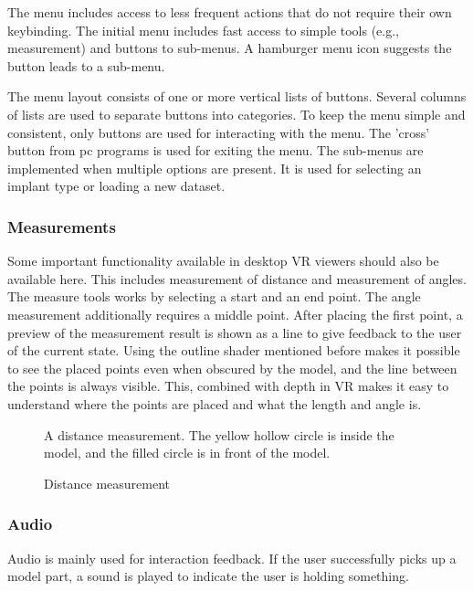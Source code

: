 \documentclass[a4paper]{report}
\begin{document}
The menu includes access to less frequent actions that do not require their own keybinding. The initial menu includes fast access to simple tools (e.g., measurement) and buttons to sub-menus. A hamburger menu icon suggests the button leads to a sub-menu.

The menu layout consists of one or more vertical lists of buttons. Several columns of lists are used to separate buttons into categories. To keep the menu simple and consistent, only buttons are used for interacting with the menu. The 'cross' button from pc programs is used for exiting the menu.
The sub-menus are implemented when multiple options are present. It is used for selecting an implant type or loading a new dataset.

\subsubsection{Measurements}
Some important functionality available in desktop VR viewers should also be available here. This includes measurement of distance and measurement of angles.
The measure tools works by selecting a start and an end point. The angle measurement additionally requires a middle point.
After placing the first point, a preview of the measurement result is shown as a line to give feedback to the user of the current state.
Using the outline shader mentioned before makes it possible to see the placed points even when obscured by the model, and the line between the points is always visible. This, combined with depth in VR makes it easy to understand where the points are placed and what the length and angle is.

\begin{figure}[h!]
    \centering
	\hfill
  \caption{Distance measurement}
  \small
  A distance measurement. The yellow hollow circle is inside the model, and the filled circle is in front of the model.
~\cite{mishra_virtual_2019}
\end{figure}

\subsubsection{Audio}
Audio is mainly used for interaction feedback. If the user successfully picks up a model part, a sound is played to indicate the user is holding something.
\end{document}
